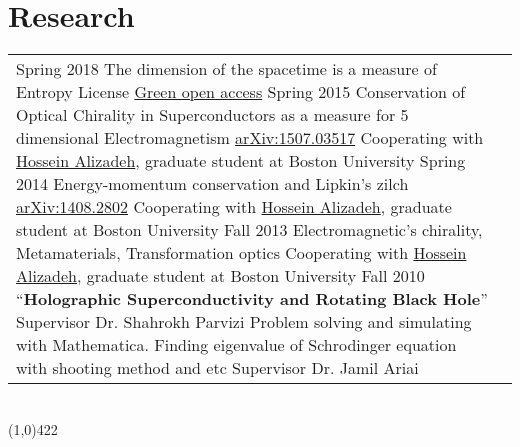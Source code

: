 \documentclass[10pt]{article}
\newcommand\HRule{\hspace*{.8cm}\line(1,0){422}\\}
\newenvironment{Record}[1]
{
    \vspace{-0.5cm}
    \section*{#1}
        \vspace{0.1cm}
        \begin{tabular}
}
{
        \end{tabular}\\
        \HRule
}
\newcommand\subsectionstyle{\textbf\textsl\subsectionfont}
\newcommand\subsubsectionstyle{\scriptsize\texttt\subsubsectionfont}
\begin{document}
\begin{Record}{Research}{l p{11cm}}
    \Research{Independent Research}
        {Spring 2018}
        {The dimension of the spacetime is a measure of Entropy}
        {License}
        {\href{https://gitlab.com/hadilq/entropy-dimension-article}{Green open access}}
        {}{}%
    \Research{Publication}
        {Spring 2015}
        {Conservation of Optical Chirality in Superconductors as a measure for 5 dimensional Electromagnetism \href{http://arxiv.org/abs/1507.03517}{arXiv:1507.03517}}
        {Cooperating with}
        {\href{http://physics.bu.edu/people/show/halizade}{Hossein Alizadeh}, graduate student at Boston University}
        {}{}%
    \Research{Publication}
        {Spring 2014}
        {Energy-momentum conservation and Lipkin’s zilch \href{http://arxiv.org/abs/1408.2802}{arXiv:1408.2802}}
        {Cooperating with}
        {\href{http://physics.bu.edu/people/show/halizade}{Hossein Alizadeh}, graduate student at Boston University}
        {}{}%
    \Research{Independent Research}
        {Fall 2013}
        {Electromagnetic's chirality, Metamaterials, Transformation optics}
        {Cooperating with}
        {\href{http://physics.bu.edu/people/show/halizade}{Hossein Alizadeh}, graduate student at Boston University}
        {}{}%
    \Research{M.Sc thesis}
        {Fall 2010}
        {``\textbf{Holographic Superconductivity and Rotating Black Hole}''}
        {Supervisor}
        {Dr. Shahrokh Parvizi}
        {}{}%
    \Research{B.Sc projects}
        {}
        {Problem solving and simulating with Mathematica.}
        {}
        {Finding eigenvalue of Schrodinger equation with shooting method and etc}
        {Supervisor}
        {Dr. Jamil Ariai}%

\end{Record}


\newcommand{\Reference}[5]{
    \multicolumn{2}{l}{\subsectionstyle{#1}}\\
    \quad#2&\subsubsectionstyle{#3}\\
    &\subsubsectionstyle{#4}\\
    &\subsubsectionstyle{#5}\\
}
\end{document}
